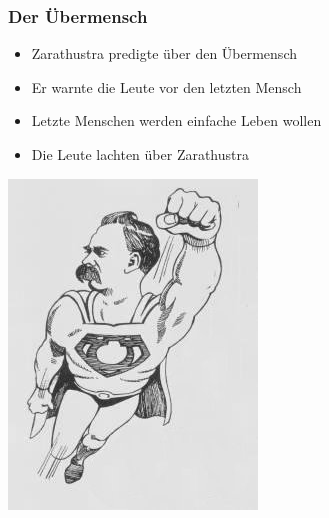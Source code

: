 \documentclass{beamer}
\begin{document}
\begin{frame}
\frametitle{Der Übermensch}
\begin{minipage}{.49\textwidth}
\begin{itemize}
\item Zarathustra predigte über den Übermensch
\item Er warnte die Leute vor den letzten Mensch
\item Letzte Menschen werden einfache Leben wollen
\item Die Leute lachten über Zarathustra
\end{itemize}
\end{minipage}
\begin{minipage}{.49\textwidth}
\includegraphics[width=\textwidth]{ubermensch.jpg}
\end{minipage}
\end{frame}
\end{document}
